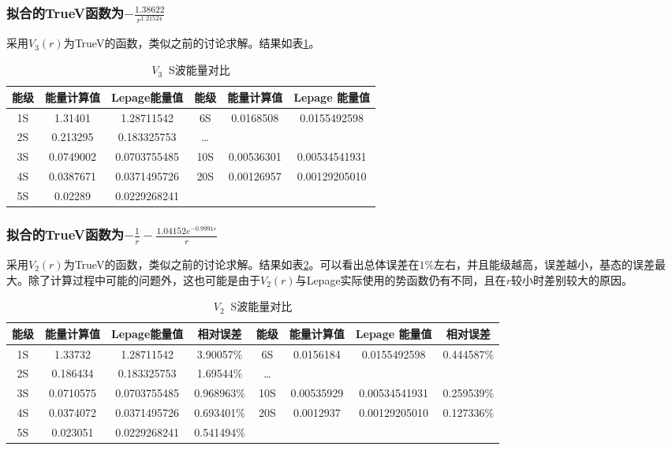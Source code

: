 \documentclass[hyperref,cs4size,titlepage,twoside]{ctexart}
\begin{document}
\subsubsection{拟合的TrueV函数为$\displaystyle-\frac{1.38622}{r^{1.21524}}$}
采用$V_3(r)$为TrueV的函数，类似之前的讨论求解。结果如表\ref{V3swave}。
\begin{table}[!htbp]
  \centering
  \begin{tabular}{|cccccc|}
    \hline
    能级 & 能量计算值 & Lepage能量值 & 能级 & 能量计算值 & Lepage 能量值 \\
    \hline
    1S & 1.31401 & 1.28711542 & 6S & 0.0168508 & 0.0155492598 \\
    2S & 0.213295 & 0.183325753  & \dots &   & \\
    3S & 0.0749002 & 0.0703755485 & 10S & 0.00536301 & 0.00534541931 \\
    4S & 0.0387671 & 0.0371495726 & 20S & 0.00126957 & 0.00129205010 \\
    5S & 0.02289 & 0.0229268241  &  &  &  \\
    \hline
  \end{tabular}
  \caption{$V_3\;\;$S波能量对比}\label{V3swave}
\end{table}
\subsubsection{拟合的TrueV函数为$\displaystyle-\frac{1}{r}-\frac{1.04152e^{-0.9991r}}{r}$}
采用$V_2(r)$为TrueV的函数，类似之前的讨论求解。结果如表\ref{V2swave}。可以看出总体误差在$1\%$左右，并且能级越高，误差越小，基态的误差最大。除了计算过程中可能的问题外，这也可能是由于$V_2(r)$与Lepage实际使用的势函数仍有不同，且在$r$较小时差别较大的原因。
\clearpage
\begin{table}[!htbp]
  \centering
  \begin{tabular}{|cccccccc|}
    \hline
    能级 & 能量计算值 & Lepage能量值 & 相对误差 & 能级 & 能量计算值 & Lepage 能量值 & 相对误差 \\
    \hline
    1S & 1.33732 & 1.28711542 & 3.90057\% & 6S & 0.0156184 & 0.0155492598 & 0.444587\% \\
    2S & 0.186434 & 0.183325753 & 1.69544\% & \dots &   &  & \\
    3S & 0.0710575 & 0.0703755485 & 0.968963\% & 10S & 0.00535929 & 0.00534541931 & 0.259539\% \\
    4S & 0.0374072 & 0.0371495726 & 0.693401\% & 20S & 0.0012937 & 0.00129205010 &0.127336\%\\
    5S & 0.023051 & 0.0229268241 & 0.541494\% &  &  & & \\
    \hline
  \end{tabular}
  \caption{$V_2\;\;$S波能量对比}\label{V2swave}
\end{table}
\end{document}
